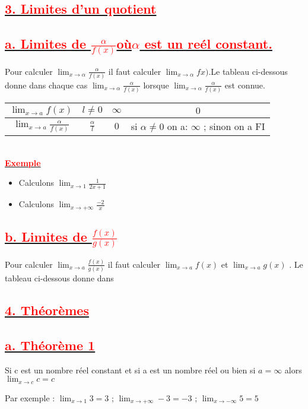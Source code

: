 \documentclass[12pt]{article}
\begin{document}
\subsection*{\underline{\textbf{\textcolor{red}{3. Limites d’un quotient}}}}
\subsection*{\underline{\textbf{\textcolor{red}{a. Limites de $\frac{\alpha}{f(x)}$où$\alpha$ est un reél constant.}}}}
Pour calculer $\lim_{x \to \alpha}\frac{\alpha}{f(x)}$ il faut calculer $\lim_{x \to \alpha}fx)$.Le tableau ci-dessous donne dans chaque cas $\lim_{x \to \alpha}\frac{\alpha}{f(x)}$
lorsque $\lim_{x \to \alpha}\frac{\alpha}{f(x)}$ est connue.\\
\begin{tabular}{|c|c|c|c|}
\hline
$\lim_{x \to a}f	(x)$ & $l\neq 0$ & $\infty$ & $0$\\
\hline
$\lim_{x \to a}\frac{\alpha}{f(x)}$ & $\frac{\alpha}{l}$ & $0$ &si $\alpha \neq 0$ on a: $\infty$ ; sinon on a FI\\
\hline
\end{tabular}\\
\underline{\textbf{\textcolor{red}{Exemple}}}
\begin{itemize}
\item Calculons $\lim_{x \to 1}\frac{1}{2x+1}$
\item Calculons $\lim_{x \to +\infty}\frac{-2}{x}$
\end{itemize}
\subsection*{\underline{\textbf{\textcolor{red}{b. Limites de $\frac{f(x)}{g(x)}$}}}}
Pour calculer $\lim_{x \to a}\frac{f(x)}{g(x)}$ il faut calculer $\lim_{x \to a}f(x)$ et 
$\lim_{x \to a}g(x)$ . Le tableau ci-dessous donne dans
\subsection*{\underline{\textbf{\textcolor{red}{4. Théorèmes}}}}
\subsection*{\underline{\textbf{\textcolor{red}{a. Théorème 1}}}}
Si c est un nombre réel constant et si a est un nombre réel ou bien si 
$a=\infty$ alors $\lim_{x \to c}c=c$

Par exemple : $\lim_{x \to 1}3=3$ ; $\lim_{x \to +\infty}-3=-3$ ; $\lim_{x \to -\infty}5=5$
\end{document}
